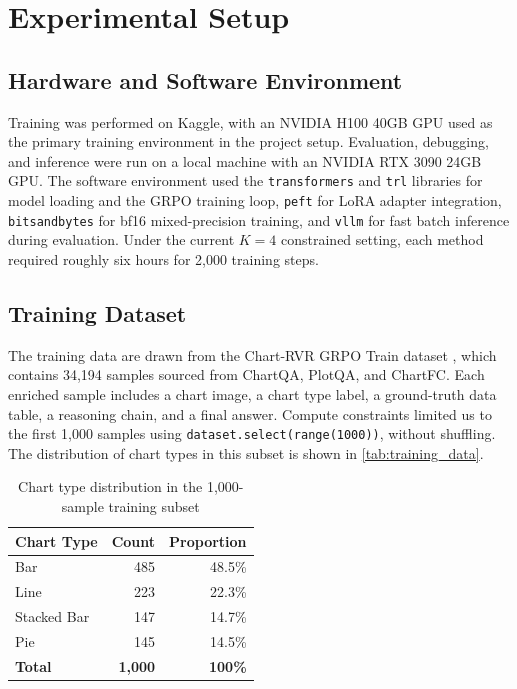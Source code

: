 \documentclass{iutbscthesis}
\begin{document}
\section{Experimental Setup}

\subsection{Hardware and Software Environment}

Training was performed on Kaggle, with an NVIDIA H100 40GB GPU used as the primary training environment in the project setup. Evaluation, debugging, and inference were run on a local machine with an NVIDIA RTX 3090 24GB GPU. The software environment used the \texttt{transformers} and \texttt{trl} libraries for model loading and the GRPO training loop, \texttt{peft} for LoRA adapter integration, \texttt{bitsandbytes} for bf16 mixed-precision training, and \texttt{vllm} for fast batch inference during evaluation. Under the current $K=4$ constrained setting, each method required roughly six hours for 2,000 training steps.

\subsection{Training Dataset}

The training data are drawn from the Chart-RVR GRPO Train dataset \cite{sinha2025chartrvr}, which contains 34,194 samples sourced from ChartQA, PlotQA, and ChartFC. Each enriched sample includes a chart image, a chart type label, a ground-truth data table, a reasoning chain, and a final answer. Compute constraints limited us to the first 1,000 samples using \texttt{dataset.select(range(1000))}, without shuffling. The distribution of chart types in this subset is shown in \autoref{tab:training_data}.

\begin{table}[H]
    \centering
    \begin{tabular}{lrr}
        \toprule
        Chart Type & Count & Proportion \\
        \midrule
        Bar         & 485 & 48.5\% \\
        Line        & 223 & 22.3\% \\
        Stacked Bar & 147 & 14.7\% \\
        Pie         & 145 & 14.5\% \\
        \midrule
        \textbf{Total} & \textbf{1,000} & \textbf{100\%} \\
        \bottomrule
    \end{tabular}
    \caption{Chart type distribution in the 1,000-sample training subset}
    \label{tab:training_data}
\end{table}
\end{document}
